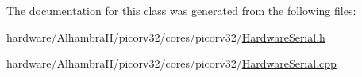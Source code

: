 The documentation for this class was generated from the following files\-:\begin{DoxyCompactItemize}
\item 
hardware/\-Alhambra\-I\-I/picorv32/cores/picorv32/\hyperlink{HardwareSerial_8h}{Hardware\-Serial.\-h}\item 
hardware/\-Alhambra\-I\-I/picorv32/cores/picorv32/\hyperlink{HardwareSerial_8cpp}{Hardware\-Serial.\-cpp}\end{DoxyCompactItemize}
